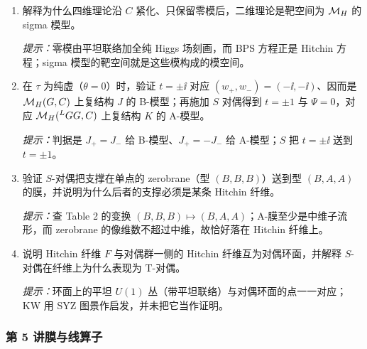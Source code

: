 \begin{enumerate}[label=\arabic*.,start=13,leftmargin=2.4em,itemsep=6pt]
\item 解释为什么四维理论沿 $C$ 紧化、只保留零模后，二维理论是靶空间为 $\mathcal{M}_{H}$ 的 sigma 模型。
\par\smallskip\noindent\emph{提示：}零模由平坦联络加全纯 Higgs 场刻画，而 BPS 方程正是 Hitchin 方程；sigma 模型的靶空间就是这些模构成的模空间。

\item 在 $\tau$ 为纯虚（$\theta=0$）时，验证 $t=\pm\ii$ 对应 $(w_+,w_-)=(-\ii,-\ii)$、因而是 $\mathcal{M}_{H}(G,C)$ 上复结构 $J$ 的 B-模型；再施加 $S$ 对偶得到 $t=\pm1$ 与 $\Psi=0$，对应 $\mathcal{M}_{H}({}^{L}G G,C)$ 上复结构 $K$ 的 A-模型。
\par\smallskip\noindent\emph{提示：}判据是 $J_+=J_-$ 给 B-模型、$J_+=-J_-$ 给 A-模型；$S$ 把 $t=\pm\ii$ 送到 $t=\pm1$。

\item 验证 $S$-对偶把支撑在单点的 zerobrane（型 $(B,B,B)$）送到型 $(B,A,A)$ 的膜，并说明为什么后者的支撑必须是某条 Hitchin 纤维。
\par\smallskip\noindent\emph{提示：}查 Table 2 的变换 $(B,B,B)\mapsto(B,A,A)$；A-膜至少是中维子流形，而 zerobrane 的像维数不超过中维，故恰好落在 Hitchin 纤维上。

\item 说明 Hitchin 纤维 $F$ 与对偶群一侧的 Hitchin 纤维互为对偶环面，并解释 $S$-对偶在纤维上为什么表现为 T-对偶。
\par\smallskip\noindent\emph{提示：}环面上的平坦 $U(1)$ 丛（带平坦联络）与对偶环面的点一一对应；KW 用 SYZ 图景作启发，并未把它当作证明。
\end{enumerate}

\subsubsection*{第 5 讲\quad 膜与线算子}

